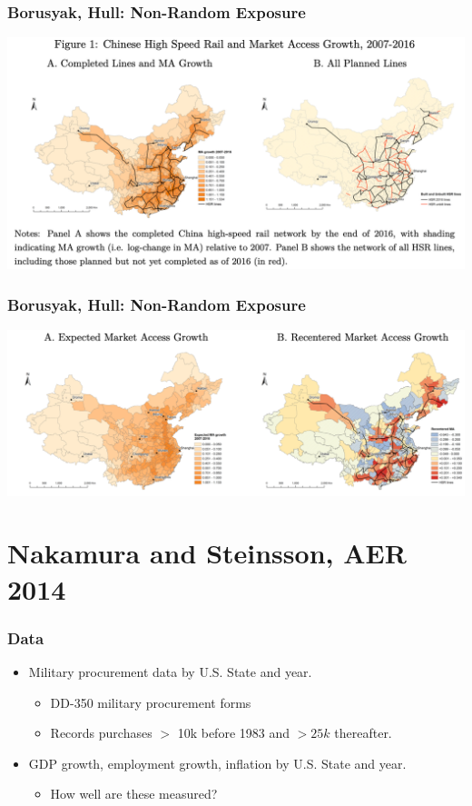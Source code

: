 \documentclass[english,xcolor=svgnames]{beamer}
\begin{document}
\begin{frame}
\frametitle[alignment=center]{Borusyak, Hull: Non-Random Exposure}
\centering
\includegraphics[scale=0.5]{figures/BHFIG1.png}
\end{frame}

\begin{frame}
\frametitle[alignment=center]{Borusyak, Hull: Non-Random Exposure}
\centering
\includegraphics[scale=0.5]{figures/BHFIG2.png}
\end{frame}



\section{Nakamura and Steinsson, AER 2014}

\begin{frame}
\frametitle[alignment=center]{Data}
\begin{itemize}
	\item Military procurement data by U.S. State and year.
	\begin{itemize}
		\item  DD-350 military procurement forms
		\item Records purchases $>$ 10k before 1983 and $>25k$ thereafter.
	\end{itemize}	
	\item GDP growth, employment growth, inflation by U.S. State and year.
	\begin{itemize}
		\item How well are these measured?
	\end{itemize}
\end{itemize}
\end{frame}
\end{document}
